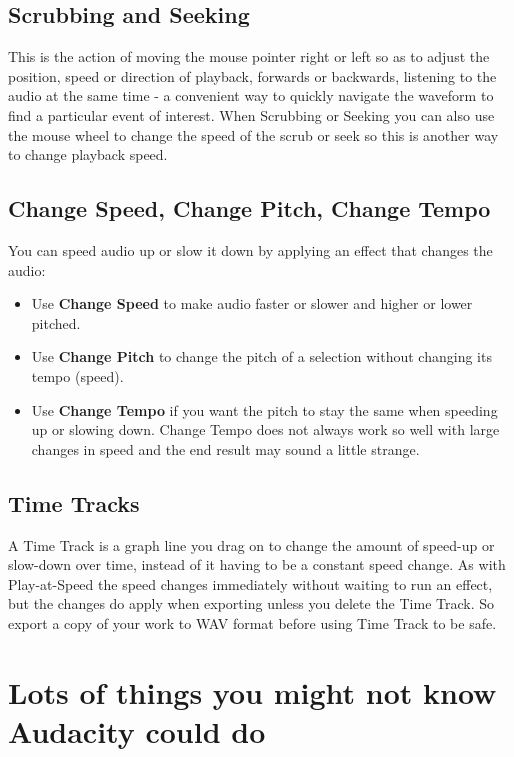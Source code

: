 \documentclass[twocolumn]{book}
\begin{document}
\subsection{Scrubbing and Seeking}


This is the action of moving the mouse pointer right or left so as to adjust the position, speed or direction of playback, forwards or backwards, listening to the audio at the same time - a convenient way to quickly navigate the waveform to find a particular event of interest. When Scrubbing or Seeking you can also use the mouse wheel to change the speed of the scrub or seek so this is another way to change playback speed.

\subsection{Change Speed, Change Pitch, Change Tempo}


You can speed audio up or slow it down by applying an effect that changes the audio:  
\begin{itemize}
\item  Use \textbf{Change Speed} to make audio faster or slower and higher or lower pitched. 
\item  Use \textbf{Change Pitch} to change the pitch of a selection without changing its tempo (speed). 
\item  Use \textbf{Change Tempo} if you want the pitch to stay the same when speeding up or slowing down. Change Tempo does not always work so well with large changes in speed and the end result may sound a little strange.
\end{itemize}

\subsection{Time Tracks}


A Time Track is a graph line you drag on to change the amount of speed-up or slow-down over time, instead of it having to be a constant speed change. As with Play-at-Speed the speed changes immediately without waiting to run an effect, but the changes do apply when exporting unless you delete the Time Track. So export a copy of your work to WAV format before using Time Track to be safe. 



\section{Lots of things you might not know Audacity could do}
\end{document}
